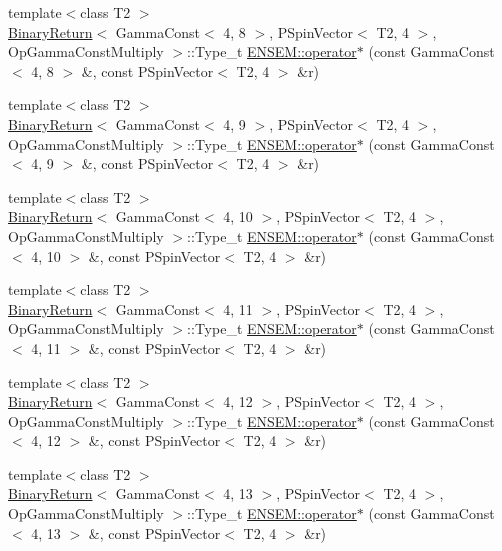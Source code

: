 \begin{DoxyCompactItemize}
\item 
{\footnotesize template$<$class T2 $>$ }\\\mbox{\hyperlink{structBinaryReturn}{Binary\+Return}}$<$ Gamma\+Const$<$ 4, 8 $>$, P\+Spin\+Vector$<$ T2, 4 $>$, Op\+Gamma\+Const\+Multiply $>$\+::Type\+\_\+t \mbox{\hyperlink{group__primspinvector_gadf1f85c537d85cf1fb2e4dbc24de9d81}{E\+N\+S\+E\+M\+::operator$\ast$}} (const Gamma\+Const$<$ 4, 8 $>$ \&, const P\+Spin\+Vector$<$ T2, 4 $>$ \&r)
\item 
{\footnotesize template$<$class T2 $>$ }\\\mbox{\hyperlink{structBinaryReturn}{Binary\+Return}}$<$ Gamma\+Const$<$ 4, 9 $>$, P\+Spin\+Vector$<$ T2, 4 $>$, Op\+Gamma\+Const\+Multiply $>$\+::Type\+\_\+t \mbox{\hyperlink{group__primspinvector_ga61476a03c8d043d2e32e6ba22ec70bb5}{E\+N\+S\+E\+M\+::operator$\ast$}} (const Gamma\+Const$<$ 4, 9 $>$ \&, const P\+Spin\+Vector$<$ T2, 4 $>$ \&r)
\item 
{\footnotesize template$<$class T2 $>$ }\\\mbox{\hyperlink{structBinaryReturn}{Binary\+Return}}$<$ Gamma\+Const$<$ 4, 10 $>$, P\+Spin\+Vector$<$ T2, 4 $>$, Op\+Gamma\+Const\+Multiply $>$\+::Type\+\_\+t \mbox{\hyperlink{group__primspinvector_gab079c599559400400256e044d153a9f0}{E\+N\+S\+E\+M\+::operator$\ast$}} (const Gamma\+Const$<$ 4, 10 $>$ \&, const P\+Spin\+Vector$<$ T2, 4 $>$ \&r)
\item 
{\footnotesize template$<$class T2 $>$ }\\\mbox{\hyperlink{structBinaryReturn}{Binary\+Return}}$<$ Gamma\+Const$<$ 4, 11 $>$, P\+Spin\+Vector$<$ T2, 4 $>$, Op\+Gamma\+Const\+Multiply $>$\+::Type\+\_\+t \mbox{\hyperlink{group__primspinvector_ga4bbdc1bc935fc4378105903d7b0fb65d}{E\+N\+S\+E\+M\+::operator$\ast$}} (const Gamma\+Const$<$ 4, 11 $>$ \&, const P\+Spin\+Vector$<$ T2, 4 $>$ \&r)
\item 
{\footnotesize template$<$class T2 $>$ }\\\mbox{\hyperlink{structBinaryReturn}{Binary\+Return}}$<$ Gamma\+Const$<$ 4, 12 $>$, P\+Spin\+Vector$<$ T2, 4 $>$, Op\+Gamma\+Const\+Multiply $>$\+::Type\+\_\+t \mbox{\hyperlink{group__primspinvector_gacda74bfacd9c872e7d821f2355890a01}{E\+N\+S\+E\+M\+::operator$\ast$}} (const Gamma\+Const$<$ 4, 12 $>$ \&, const P\+Spin\+Vector$<$ T2, 4 $>$ \&r)
\item 
{\footnotesize template$<$class T2 $>$ }\\\mbox{\hyperlink{structBinaryReturn}{Binary\+Return}}$<$ Gamma\+Const$<$ 4, 13 $>$, P\+Spin\+Vector$<$ T2, 4 $>$, Op\+Gamma\+Const\+Multiply $>$\+::Type\+\_\+t \mbox{\hyperlink{group__primspinvector_ga7295695be69d983ea6fd8d3710a448d7}{E\+N\+S\+E\+M\+::operator$\ast$}} (const Gamma\+Const$<$ 4, 13 $>$ \&, const P\+Spin\+Vector$<$ T2, 4 $>$ \&r)

\end{DoxyCompactItemize}
